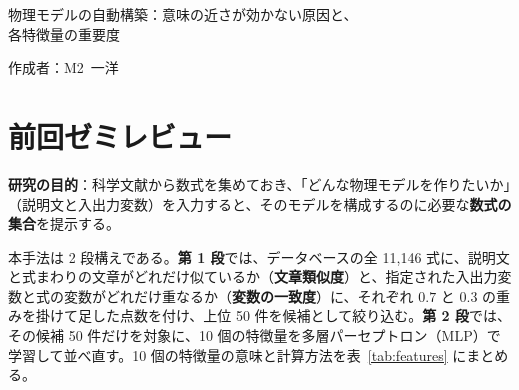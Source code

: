 \documentclass[11pt,a4paper]{ltjsarticle}
\begin{document}
\begin{center}
{\sffamily\large 物理モデルの自動構築：意味の近さが効かない原因と、\\各特徴量の重要度}
\end{center}
\vspace{0.3em}
\hfill 作成者：M2\ 一洋
\vspace{0.8em}

\section{前回ゼミレビュー}
\textbf{研究の目的}：科学文献から数式を集めておき、「どんな物理モデルを作りたいか」（説明文と入出力変数）を入力すると、そのモデルを構成するのに必要な\textbf{数式の集合}を提示する。

本手法は 2 段構えである。\textbf{第 1 段}では、データベースの全 11{,}146 式に、説明文と式まわりの文章がどれだけ似ているか（\textbf{文章類似度}）と、指定された入出力変数と式の変数がどれだけ重なるか（\textbf{変数の一致度}）に、それぞれ $0.7$ と $0.3$ の重みを掛けて足した点数を付け、上位 50 件を候補として絞り込む。\textbf{第 2 段}では、その候補 50 件だけを対象に、10 個の特徴量を多層パーセプトロン（MLP）で学習して並べ直す。10 個の特徴量の意味と計算方法を表~\ref{tab:features} にまとめる。
\end{document}

